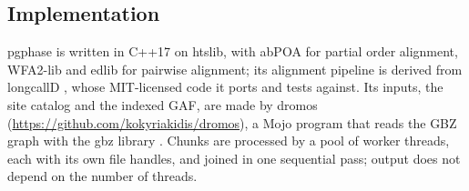 \subsection{Implementation}

pgphase is written in C++17 on htslib, with abPOA \citep{Gao2021} for partial order alignment, WFA2-lib and edlib for pairwise alignment; its alignment pipeline is derived from longcallD \citep{Gao2026}, whose MIT-licensed code it ports and tests against. Its inputs, the site catalog and the indexed GAF, are made by dromos (\url{https://github.com/kokyriakidis/dromos}), a Mojo program that reads the GBZ graph with the gbz library \citep{Siren2022}. Chunks are processed by a pool of worker threads, each with its own file handles, and joined in one sequential pass; output does not depend on the number of threads.
